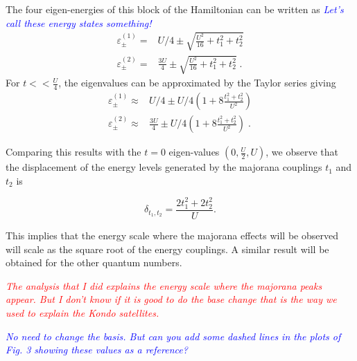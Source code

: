 \documentclass[showpacs,aps,prb,reprint,superscriptaddress]{revtex4-1}
\newcommand{\LUIS}[1]{\textcolor{blue}{\fbox{Luis} {\sl#1}}}
\newcommand{\Jesus}[1]{\textcolor{red}{\fbox{Jesus} {\sl#1}}}
\begin{document}
The four eigen-energies of this block of the Hamiltonian can be written as \LUIS{Let's call these energy states something!}
%
    \begin{eqnarray}
        \varepsilon^{(1)}_{\pm} = & U/4 \pm  \sqrt{\frac{U^2}{16} + t_1^2+t_2^2} \\ \nonumber 
        \varepsilon^{(2)}_{\pm} = &  \frac{3U}{4} \pm  \sqrt{\frac{U^2}{16}+ t_1^2+t_2^2} \; .
        \label{eq:atomiclimit1}
    \end{eqnarray}
For $t << \frac{U}{4}$, the eigenvalues can be approximated by the Taylor series giving
    \begin{eqnarray}
        \varepsilon^{(1)}_{\pm} \approx & U/4 \pm  U/4 \left(1 + 8\frac{t_1^2+t_2^2}{U^2} \right) \\ \nonumber
        \varepsilon^{(2)}_{\pm} \approx &  \frac{3U}{4} \pm  U/4 \left(1 + 8\frac{t_1^2+t_2^2}{U^2} \right) \; .
        \label{eq:atomiclimit2}
    \end{eqnarray} 

Comparing this results with the $t=0$ eigen-values $(0,\frac{U}{2},U)$, we observe that the displacement of the energy levels  generated by the majorana couplings $t_1$ and $t_2$ is 

    \begin{equation}
        \delta_{t_1,t_2} = \frac{2t_1^2+2t_2^2}{U}.
        \label{eq:displacement}
    \end{equation}

This implies that the energy scale where the majorana effects will be observed will scale as the square root of the energy couplings. A similar result will be obtained for the other quantum numbers. 


\Jesus{The analysis that I did explains the energy scale where the majorana peaks appear. But I don't know if it is good to do the base change that is the way we used to explain the Kondo satellites. }

\LUIS{No need to change the basis. But can you add some dashed lines in the plots of Fig. 3 showing these values as a reference? }
\end{document}
